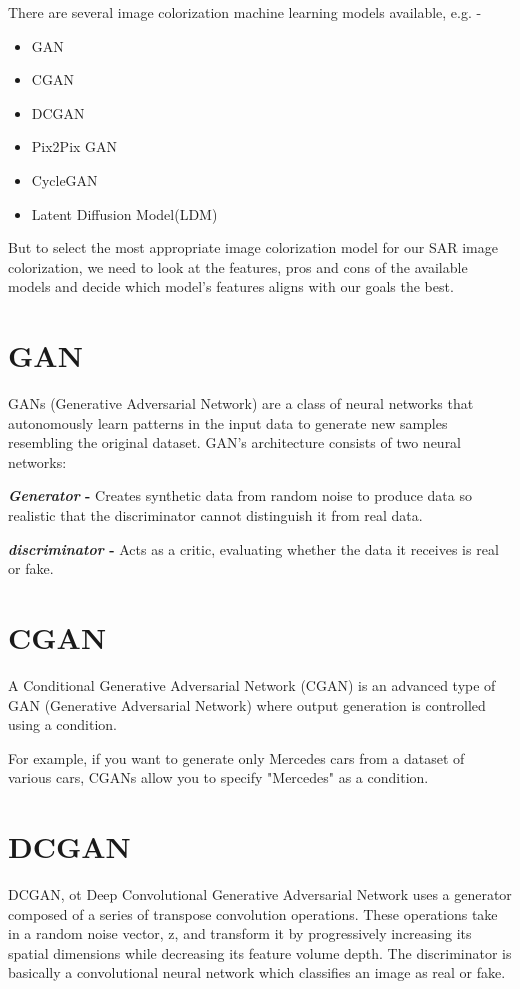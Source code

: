 There are several image colorization machine learning models available, e.g. - 
\begin{itemize}
    \item GAN
    \item CGAN
    \item DCGAN
    \item Pix2Pix GAN
    \item CycleGAN
    \item Latent Diffusion Model(LDM)
\end{itemize}

But to select the most appropriate image colorization model for our SAR image colorization, we need to look at the features, pros and cons of the available models and decide which model's features aligns with our goals the best.

\section*{GAN}
GANs (Generative Adversarial Network) are a class of neural networks that autonomously learn patterns in the input data to generate new samples resembling the original dataset.
GAN's architecture consists of two neural networks:\par
    \textbf{\textit{Generator} -} Creates synthetic data from random noise to produce data so realistic that the discriminator cannot distinguish it from real data.\par
    \textbf{\textit{discriminator} -} Acts as a critic, evaluating whether the data it receives is real or fake.

\section*{CGAN}
A Conditional Generative Adversarial Network (CGAN) is an advanced type of GAN (Generative Adversarial Network) where output generation is controlled using a condition.\par
For example, if you want to generate only Mercedes cars from a dataset of various cars, CGANs allow you to specify "Mercedes" as a condition.

\section*{DCGAN}
DCGAN, ot Deep Convolutional Generative Adversarial Network uses a generator composed of a series of transpose convolution operations. These operations take in a random noise vector, z, and transform it by progressively increasing its spatial dimensions while decreasing its feature volume depth. The discriminator is basically a convolutional neural network which classifies an image as real or fake.

